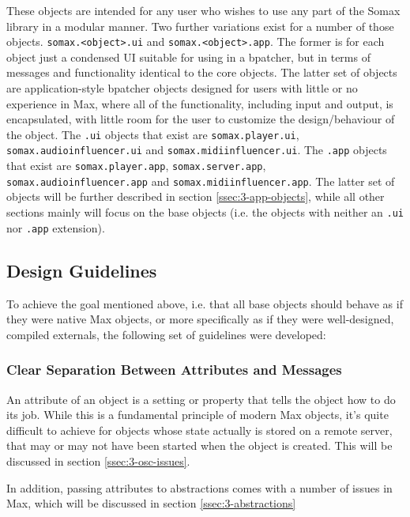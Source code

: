 \noindent These objects are intended for any user who wishes to use any part of the Somax library in a modular manner. Two further variations exist for a number of those objects. \texttt{somax.<object>.ui} and \texttt{somax.<object>.app}. The former is for each object just a condensed UI suitable for using in a bpatcher, but in terms of messages and functionality identical to the core objects. The latter set of objects are application-style bpatcher objects designed for users with little or no experience in Max, where all of the functionality, including input and output, is encapsulated, with little room for the user to customize the design/behaviour of the object. The \texttt{.ui} objects that exist are \texttt{somax.player.ui}, \texttt{somax.audioinfluencer.ui} and \texttt{somax.midiinfluencer.ui}. The \texttt{.app} objects that exist are \texttt{somax.player.app}, \texttt{somax.server.app}, \texttt{somax.audioinfluencer.app} and \texttt{somax.midiinfluencer.app}. The latter set of objects will be further described in section \ref{ssec:3-app-objects}, while all other sections mainly will focus on the base objects (i.e. the objects with neither an \texttt{.ui} nor \texttt{.app} extension).



\subsection{Design Guidelines}\label{ssec:3-global-state}
To achieve the goal mentioned above, i.e. that all base objects should behave as if they were native Max objects, or more specifically as if they were well-designed, compiled externals, the following set of guidelines were developed:

\subsubsection{Clear Separation Between Attributes and Messages}
An attribute of an object is a setting or property that tells the object how to do its job. While this is a fundamental principle of modern Max objects, it's quite difficult to achieve for objects whose state actually is stored on a remote server, that may or may not have been started when the object is created. This will be discussed in section \ref{ssec:3-osc-issues}.

In addition, passing attributes to abstractions comes with a number of issues in Max, which will be discussed in section \ref{ssec:3-abstractions}

